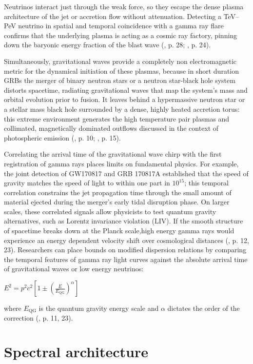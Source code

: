 \documentclass{aa} %
\begin{document}
Neutrinos interact just through the weak force, so they escape the dense plasma architecture of the jet or accretion flow without attenuation. Detecting a TeV–PeV neutrino in spatial and temporal coincidence with a gamma ray flare confirms that the underlying plasma is acting as a cosmic ray factory, pinning down the baryonic energy fraction of the blast wave (\citet{KumarandZhang2015}, p. 28; \citet{Addazietal2021}, p. 24).

Simultaneously, gravitational waves provide a completely non electromagnetic metric for the dynamical initiation of these plasmas, because in short duration GRBs the merger of binary neutron stars or a neutron star-black hole system distorts spacetime, radiating gravitational waves that map the system's mass and orbital evolution prior to fusion. It leaves behind a hypermassive neutron star or a stellar mass black hole surrounded by a dense, highly heated accretion torus: this extreme environment generates the high temperature pair plasmas and collimated, magnetically dominated outflows discussed in the context of photospheric emission (\citet{Peer2019}, p. 10; \citet{KumarandZhang2015}, p. 15).

Correlating the arrival time of the gravitational wave chirp with the first registration of gamma rays places limits on fundamental physics. For example, the joint detection of GW170817 and GRB 170817A established that the speed of gravity matches the speed of light to within one part in $10^{15}$; this temporal correlation constrains the jet propagation time through the small amount of material ejected during the merger's early tidal disruption phase. On larger scales, these correlated signals allow physicists to test quantum gravity alternatives, such as Lorentz invariance violation (LIV). If the smooth structure of spacetime breaks down at the Planck scale,high energy gamma rays would experience an energy dependent velocity shift over cosmological distances (\citet{Addazietal2021}, p. 12, 23). Researchers can place bounds on modified dispersion relations by comparing the temporal features of gamma ray light curves against the absolute arrival time of gravitational waves or low energy neutrinos:

$E^2 = p^2 c^2 \left[ 1 \pm \left( \frac{E}{E_{\text{QG}}} \right)^\alpha \right]$

where $E_{\text{QG}}$ is the quantum gravity energy scale and $\alpha$ dictates the order of the correction (\citet{Addazietal2021}, p. 11, 23). 

\section{Spectral architecture}
\end{document}
